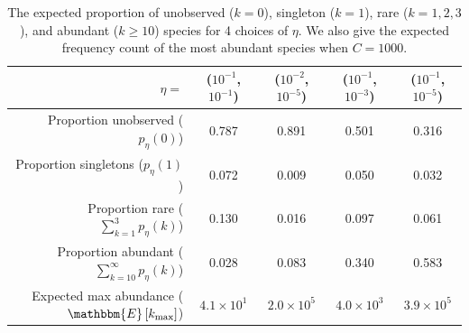 \documentclass[12pt]{article}
\theoremstyle{break}
\theoremstyle{break}
\begin{document}


\begin{table}[t]
\caption{The expected proportion of unobserved ($k=0$), singleton ($k=1$), rare ($k=1,2,3$), and abundant  ($k \geq 10$) species for 4 choices of $\eta$.  We also give the expected frequency count of the most abundant species when $C = 1000$.
\label{tab:eta_intuition}}
\centering
\footnotesize
\begin{tabular}{rcccc}
  \hline
 $\eta = $ & ($10^{-1}$, $10^{-1}$) & ($10^{-2}$, $10^{-5}$) & ($10^{-1}$, $10^{-3}$) & ($10^{-1}$, $10^{-5}$) \\
  \hline
  Proportion unobserved ($p_{\eta}(0)$) & 0.787 & 0.891 & 0.501 & 0.316 \\
  Proportion singletons ($p_{\eta}(1)$) & 0.072 & 0.009 & 0.050 & 0.032 \\
  Proportion rare ($\sum_{k=1}^3 p_{\eta}(k)$) & 0.130 & 0.016 & 0.097 & 0.061 \\
  Proportion abundant ($\sum_{k=10}^{\infty} p_{\eta}(k)$) & 0.028 & 0.083 & 0.340 & 0.583 \\
Expected max abundance ($\mathbbm{E}\left[k_{\text{max}}\right]$) & $4.1 \times 10^{1}$ & $2.0 \times 10^{5}$ & $4.0 \times 10^{3}$ & $3.9 \times 10^{5}$ \\
   \hline
\end{tabular}
\normalsize
\end{table}
\end{document}
